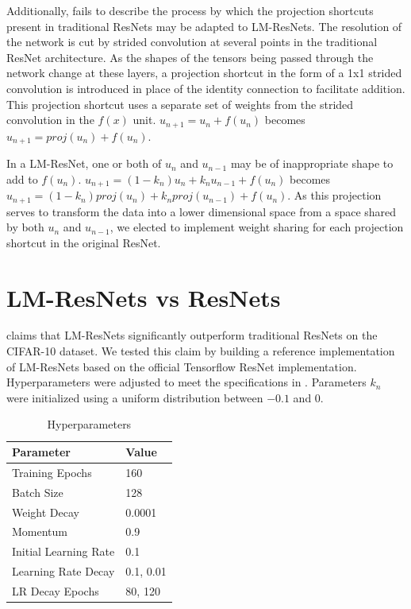\documentclass{article}
\begin{document}
Additionally, \citet{Lu} fails to describe the process by which the projection shortcuts present in
traditional ResNets may be adapted to LM-ResNets. The resolution of the network is cut by strided
convolution at several points in the traditional ResNet architecture. As the shapes of the tensors
being passed through the network change at these layers, a projection shortcut in the form of a 1x1 strided convolution is introduced in place of the identity connection to facilitate addition. This projection shortcut uses a separate set of weights from the strided convolution in 
the $f(x)$ unit. $u_{n+1} = u_n + f(u_n)$ becomes $u_{n+1} = proj(u_n) + f(u_n)$. 

In a LM-ResNet, one or both of $u_n$ and $u_{n-1}$ may be of inappropriate shape to add to $f(u_n)$. 
$u_{n+1} = (1 - k_n)u_n + k_n u_{n-1} + f(u_n)$ becomes $u_{n+1} = (1 - k_n)proj(u_n) + k_n proj(u_{n-1}) + f(u_n)$. As this projection serves to transform the data into a lower dimensional
space from a space shared by both $u_n$ and $u_{n-1}$, we elected to implement weight sharing for each
projection shortcut in the original ResNet. 

\section{LM-ResNets vs ResNets}

\citet{Lu} claims that LM-ResNets significantly outperform traditional ResNets on the CIFAR-10 dataset.
We tested this claim by building a reference implementation of LM-ResNets based on the official
Tensorflow ResNet implementation. Hyperparameters were adjusted to meet the specifications in \citep{Lu}.
Parameters $k_n$ were initialized using a uniform distribution between $-0.1$ and $0$.
\begin{table}[h]
  \caption{Hyperparameters}
  \centering
  \begin{tabular}{ll}
    \toprule
    Parameter             & Value     \\
    \midrule
    Training Epochs       & 160       \\
    Batch Size            & 128       \\
    Weight Decay          & 0.0001    \\
    Momentum              & 0.9       \\
    Initial Learning Rate & 0.1       \\
    Learning Rate Decay   & 0.1, 0.01 \\
    LR Decay Epochs 	  & 80, 120   \\
    \bottomrule
  \end{tabular}
\end{table}
\end{document}
